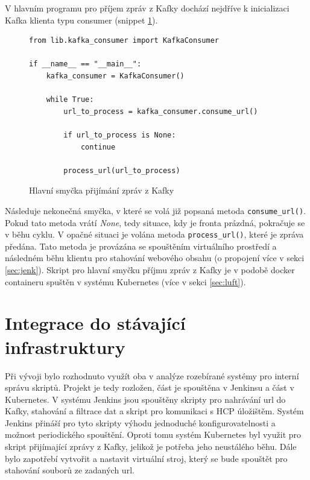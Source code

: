 \documentclass[thesis=M,czech,hidelinks]{FITthesis}[2013/05/06]
\begin{document}
V hlavním programu pro příjem zpráv z Kafky dochází nejdříve k inicializaci Kafka klienta typu consumer (snippet \ref{snip:kafkamain consum}).
\begin{figure}[h]               
	\begin{verbatim}
from lib.kafka_consumer import KafkaConsumer

if __name__ == "__main__":
    kafka_consumer = KafkaConsumer()
    
    while True:
        url_to_process = kafka_consumer.consume_url()

        if url_to_process is None:
            continue
        
        process_url(url_to_process)
	\end{verbatim}      
	\caption{Hlavní smyčka přijímání zpráv z Kafky}
	\label{snip:kafkamain consum}
\end{figure}
Následuje nekonečná smyčka, v které se volá již popsaná metoda \texttt{consume_url()}. Pokud tato metoda vrátí \textit{None}, tedy situace, kdy je fronta prázdná, pokračuje se v běhu cyklu. V opačné situaci je volána metoda \texttt{process_url()}, které je zpráva předána. Tato metoda je provázána se spouštěním virtuálního prostředí a následném běhu klientu pro stahování webového obsahu (o propojení více v sekci \ref{sec:jenk}).  Skript pro hlavní smyčku příjmu zpráv z Kafky je v podobě docker containeru spuštěn v systému Kubernetes (více v sekci \ref{sec:luft}). 





\section{Integrace do stávající infrastruktury} \label{sec:integrace}
Při vývoji bylo rozhodnuto využít oba v analýze rozebírané systémy pro interní správu skriptů. Projekt je tedy rozložen, část je spouštěna v Jenkinsu a část v Kubernetes. V systému Jenkins jsou spouštěny skripty pro nahrávání url do Kafky, stahování a filtrace dat a skript pro komunikaci s HCP úložištěm. Systém Jenkins přináší pro tyto skripty výhodu jednoduché konfigurovatelnosti a možnost periodického spouštění. Oproti tomu systém Kubernetes byl využit pro skript přijímající zprávy z Kafky, jelikož je potřeba jeho neustálého běhu. Dále bylo zapotřebí vytvořit a nastavit virtuální stroj, který se bude spouštět pro stahování souborů ze zadaných url.
\end{document}
